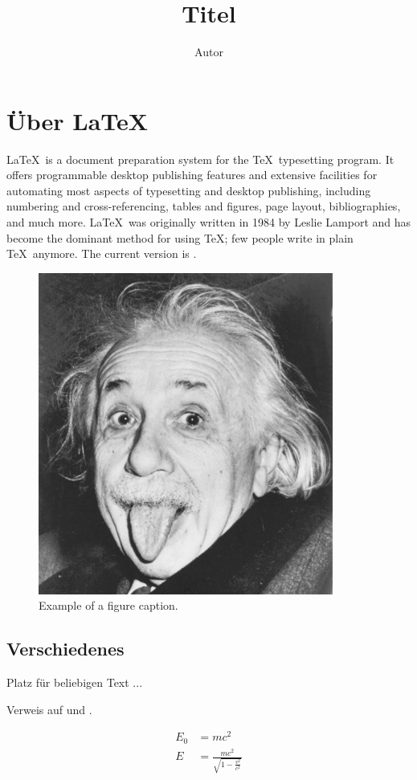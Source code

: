 \documentclass[a4paper, numbers=withenddot, 11pt]{scrartcl}
\title{{{Titel}}}
\author{{{Autor}}}
\begin{document}
\maketitle
\tableofcontents

\section{Über \LaTeX}

\LaTeX\ is a document preparation system for the \TeX\ typesetting program. It offers programmable desktop publishing features and extensive facilities for automating most aspects of typesetting and desktop publishing, including numbering and  cross-referencing, tables and figures, page layout, bibliographies, and much more. \LaTeX\ was originally written in 1984 by Leslie Lamport and has become the  dominant method for using \TeX; few people write in plain \TeX\ anymore. The current version is \LaTeXe.

\begin{figure}[htbp]
\centerline{\includegraphics[width=0.3\linewidth]{einstein}}
\caption{Example of a figure caption.}
\label{fig}
\end{figure}

\subsection{Verschiedenes}

{{Platz für beliebigen Text ... }}



Verweis auf \cite{scheme} und \cite[17]{knuth}.

\begin{align}
E_0 &= mc^2 \\
E &= \frac{mc^2}{\sqrt{1-\frac{v^2}{c^2}}}
\end{align}

\printbibliography
\end{document}
